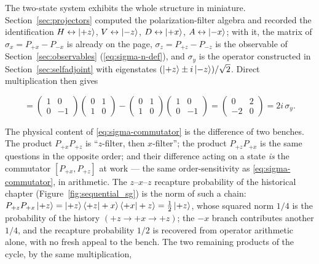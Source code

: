 The two-state system exhibits the whole structure in miniature. Section~\ref{sec:projectors} computed the polarization-filter algebra and recorded the identification $H \leftrightarrow \ket{+z}$, $V \leftrightarrow \ket{-z}$, $D \leftrightarrow \ket{+x}$, $A \leftrightarrow \ket{-x}$; with it, the matrix of $\sigma_x = P_{+x} - P_{-x}$ is already on the page, $\sigma_z = P_{+z} - P_{-z}$ is the observable of Section~\ref{sec:observables} (\eqref{eq:sigma-n-def}), and $\sigma_y$ is the operator constructed in Section~\ref{sec:selfadjoint} with eigenstates $(\ket{+z} \pm i\ket{-z})/\sqrt{2}$. Direct multiplication then gives
\begin{linenomath}
    \begin{equation}
        [\sigma_z, \sigma_x]
        = \begin{pmatrix} 1 & 0 \\ 0 & -1 \end{pmatrix}\begin{pmatrix} 0 & 1 \\ 1 & 0 \end{pmatrix}
        - \begin{pmatrix} 0 & 1 \\ 1 & 0 \end{pmatrix}\begin{pmatrix} 1 & 0 \\ 0 & -1 \end{pmatrix}
        = \begin{pmatrix} 0 & 2 \\ -2 & 0 \end{pmatrix}
        = 2i\,\sigma_y .
        \label{eq:sigma-commutator}
    \end{equation}
\end{linenomath}
The physical content of \eqref{eq:sigma-commutator} is the difference of two benches. The product $P_{+x}P_{+z}$ is ``$z$-filter, then $x$-filter''; the product $P_{+z}P_{+x}$ is the same questions in the opposite order; and their difference acting on a state \emph{is} the commutator $[P_{+x},P_{+z}]$ at work --- the same order-sensitivity as \eqref{eq:sigma-commutator}, in arithmetic. The $z$--$x$--$z$ recapture probability of the historical chapter (Figure~\ref{fig:sequential_sg}) is the norm of such a chain: $P_{+z}P_{+x}\ket{+z} = \ket{+z}\braket{+z|+x}\braket{+x|+z} = \tfrac{1}{2}\ket{+z}$, whose squared norm $1/4$ is the probability of the history $({+z} \to {+x} \to {+z})$; the ${-x}$ branch contributes another $1/4$, and the recapture probability $1/2$ is recovered from operator arithmetic alone, with no fresh appeal to the bench. The two remaining products of the cycle, by the same multiplication,
